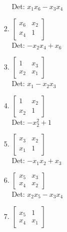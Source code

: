 \documentclass[12pt]{article}
\begin{document}
\begin{enumerate}
\begin{enumerate}
\begin{enumerate}
Det: $x_{1} x_{6} - x_{3} x_{4}$\\


\item $\displaystyle \left[\begin{matrix}x_{6} & x_{2}\\x_{4} & 1\end{matrix}\right]$\\

Det: $- x_{2} x_{4} + x_{6}$\\


\item $\displaystyle \left[\begin{matrix}1 & x_{3}\\x_{2} & x_{1}\end{matrix}\right]$\\

Det: $x_{1} - x_{2} x_{3}$\\


\item $\displaystyle \left[\begin{matrix}1 & x_{2}\\x_{2} & 1\end{matrix}\right]$\\

Det: $- x_{2}^{2} + 1$\\


\item $\displaystyle \left[\begin{matrix}x_{3} & x_{2}\\x_{1} & 1\end{matrix}\right]$\\

Det: $- x_{1} x_{2} + x_{3}$\\


\item $\displaystyle \left[\begin{matrix}x_{5} & x_{3}\\x_{4} & x_{2}\end{matrix}\right]$\\

Det: $x_{2} x_{5} - x_{3} x_{4}$\\


\item $\displaystyle \left[\begin{matrix}x_{5} & 1\\x_{4} & x_{1}\end{matrix}\right]$\\


\end{enumerate}
\end{enumerate}
\end{enumerate}
\end{document}
